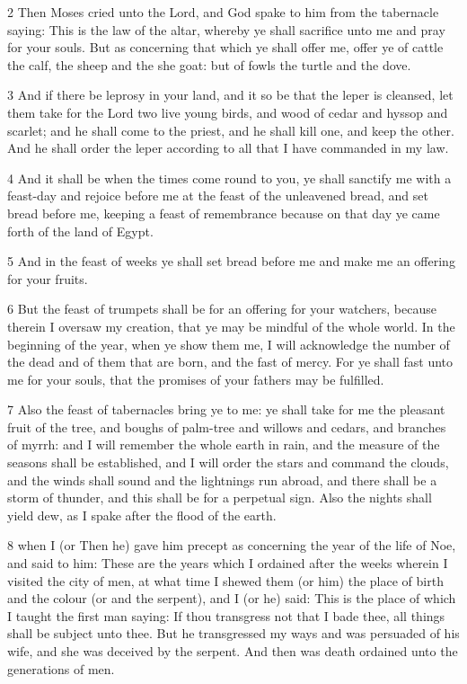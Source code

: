 \par 2 Then Moses cried unto the Lord, and God spake to him from the tabernacle saying: This is the law of the altar, whereby ye shall sacrifice unto me and pray for your souls. But as concerning that which ye shall offer me, offer ye of cattle the calf, the sheep and the she goat: but of fowls the turtle and the dove. 

\par 3 And if there be leprosy in your land, and it so be that the leper is cleansed, let them take for the Lord two live young birds, and wood of cedar and hyssop and scarlet; and he shall come to the priest, and he shall kill one, and keep the other. And he shall order the leper according to all that I have commanded in my law. 

\par 4 And it shall be when the times come round to you, ye shall sanctify me with a feast-day and rejoice before me at the feast of the unleavened bread, and set bread before me, keeping a feast of remembrance because on that day ye came forth of the land of Egypt. 

\par 5 And in the feast of weeks ye shall set bread before me and make me an offering for your fruits. 

\par 6 But the feast of trumpets shall be for an offering for your watchers, because therein I oversaw my creation, that ye may be mindful of the whole world. In the beginning of the year, when ye show them me, I will acknowledge the number of the dead and of them that are born, and the fast of mercy. For ye shall fast unto me for your souls, that the promises of your fathers may be fulfilled. 

\par 7 Also the feast of tabernacles bring ye to me: ye shall take for me the pleasant fruit of the tree, and boughs of palm-tree and willows and cedars, and branches of myrrh: and I will remember the whole earth in rain, and the measure of the seasons shall be established, and I will order the stars and command the clouds, and the winds shall sound and the lightnings run abroad, and there shall be a storm of thunder, and this shall be for a perpetual sign. Also the nights shall yield dew, as I spake after the flood of the earth. 

\par 8 when I (or Then he) gave him precept as concerning the year of the life of Noe, and said to him: These are the years which I ordained after the weeks wherein I visited the city of men, at what time I shewed them (or him) the place of birth and the colour (or and the serpent), and I (or he) said: This is the place of which I taught the first man saying: If thou transgress not that I bade thee, all things shall be subject unto thee. But he transgressed my ways and was persuaded of his wife, and she was deceived by the serpent. And then was death ordained unto the generations of men. 

